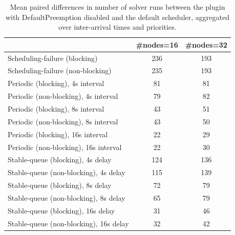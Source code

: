 \begin{table}[t]
\tiny
\setlength{\tabcolsep}{1.2pt}
\renewcommand{\arraystretch}{1.12}
\centering
\caption{Mean paired differences in number of solver runs between the plugin with DefaultPreemption disabled and the default scheduler, aggregated over inter-arrival times and priorities.}
\label{tab:solver_runs-defpreempt0-std0-agg-arrival-prio}
\begin{tabular}{l c c}
\toprule
 & \#nodes=16 & \#nodes=32 \\
\midrule
Scheduling-failure (blocking) & 236 & 193 \\
Scheduling-failure (non-blocking) & 235 & 193 \\
Periodic (blocking), 4s interval & 81 & 81 \\
Periodic (non-blocking), 4s interval & 79 & 82 \\
Periodic (blocking), 8s interval & 43 & 51 \\
Periodic (non-blocking), 8s interval & 43 & 50 \\
Periodic (blocking), 16s interval & 22 & 29 \\
Periodic (non-blocking), 16s interval & 22 & 30 \\
Stable-queue (blocking), 4s delay & 124 & 136 \\
Stable-queue (non-blocking), 4s delay & 115 & 139 \\
Stable-queue (blocking), 8s delay & 72 & 79 \\
Stable-queue (non-blocking), 8s delay & 65 & 79 \\
Stable-queue (blocking), 16s delay & 31 & 46 \\
Stable-queue (non-blocking), 16s delay & 32 & 42 \\
\bottomrule
\end{tabular}
\end{table}

